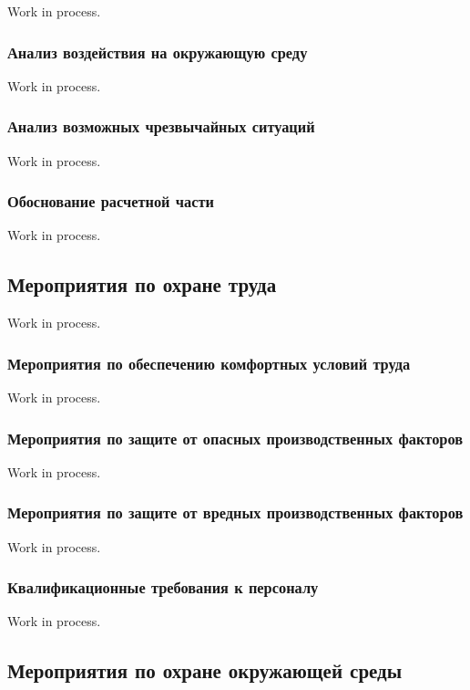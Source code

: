 Work in process.

\subsubsection{Анализ воздействия на окружающую среду}

Work in process.

\subsubsection{Анализ возможных чрезвычайных ситуаций}

Work in process.

\subsubsection{Обоснование расчетной части}

Work in process.

\subsection{Мероприятия по охране труда}

Work in process.

\subsubsection{Мероприятия по обеспечению комфортных условий труда}

Work in process.

\subsubsection{Мероприятия по защите от опасных производственных факторов}

Work in process.

\subsubsection{Мероприятия по защите от вредных производственных факторов}

Work in process.

\subsubsection{Квалификационные требования к персоналу}

Work in process.

\subsection{Мероприятия по охране окружающей среды}

